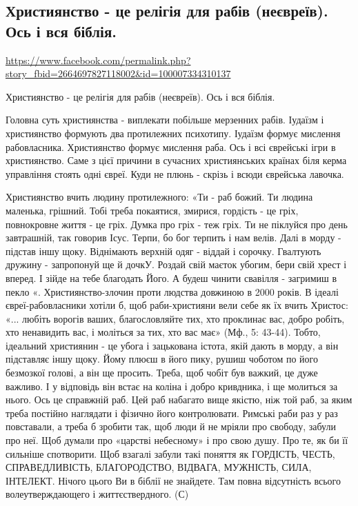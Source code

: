  
 
 
 
 

\subsection{Християнство - це релігія для рабів (неєвреїв). Ось і вся біблія.}
\label{sec:29_06_2020.fb.2.religia}
\url{https://www.facebook.com/permalink.php?story_fbid=2664697827118002&id=100007334310137}

Християнство - це релігія для рабів (неєвреїв). Ось і вся біблія.

Головна суть християнства - виплекати побільше мерзенних рабів. Іудаїзм і
християнство формують два протилежних психотипу. Іудаїзм формує мислення
рабовласника. Християнство формує мислення раба. Ось і всі єврейські  ігри в
християнство. Саме з цієї причини в сучасних християнських країнах біля керма
управління стоять одні євреї. Куди не плюнь - скрізь і всюди єврейська лавочка.

Християнство вчить людину протилежного: «Ти - раб божий. Ти людина маленька,
грішний. Тобі треба покаятися, змирися, гордість - це гріх,  повнокровне життя
- це гріх. Думка про гріх - теж гріх. Ти не піклуйся про день завтрашній, так
говорив Ісус. Терпи, бо бог терпить і нам велів. Далі в морду - підстав іншу
щоку. Віднімають верхній одяг - віддай і сорочку. Гвалтують дружину -
запропонуй ще й дочкУ. Роздай свій маєток убогим, бери свій хрест і вперед. І
зійде на тебе благодать Його. А будеш чинити свавілля - загримиш в пекло «.
Християнство-злочин проти людства довжиною в 2000 років.  В ідеалі
євреї-рабовласники хотіли б, щоб раби-християни вели себе як їх вчить Христос:
«... любіть ворогів ваших, благословляйте тих, хто проклинає вас, добро робіть,
хто ненавидить вас, і моліться за тих, хто вас має» (Мф., 5: 43-44). Тобто,
ідеальний християнин - це убога і зацькована  істота, якій дають в морду, а він
підставляє іншу щоку. Йому плюєш в його пику, рушиш чоботом по його безмозкої
голові, а він ще просить. Треба, щоб чобіт був важкий, це дуже важливо. І у
відповідь він встає на коліна і добро кривдника, і ще молиться за нього. Ось це
справжній раб. Цей раб набагато вище якістю, ніж той раб, за яким треба
постійно наглядати і фізично його контролювати. Римські раби раз у раз
повставали, а треба б зробити так, щоб люди й не мріяли про свободу, забули про
неї. Щоб думали про «царстві небесному» і про свою душу. Про те, як би її
сильніше спотворити. Щоб взагалі забули такі поняття як ГОРДІСТЬ, ЧЕСТЬ,
СПРАВЕДЛИВІСТЬ, БЛАГОРОДСТВО, ВІДВАГА, МУЖНІСТЬ, СИЛА, ІНТЕЛЕКТ. Нічого цього
Ви в біблії не знайдете. Там повна відсутність всього волеутверждающего і
життєствердного.
(С)
